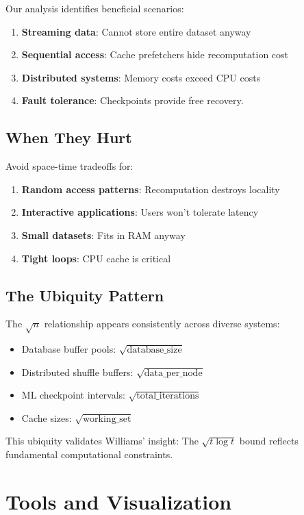 \documentclass[11pt]{article}
\theoremstyle{definition}
\begin{document}
Our analysis identifies beneficial scenarios:

\begin{enumerate}
\item \textbf{Streaming data}: Cannot store entire dataset anyway
\item \textbf{Sequential access}: Cache prefetchers hide recomputation cost
\item \textbf{Distributed systems}: Memory costs exceed CPU costs
\item \textbf{Fault tolerance}: Checkpoints provide free recovery.
\end{enumerate}

\subsection{When They Hurt}

Avoid space-time tradeoffs for:

\begin{enumerate}
\item \textbf{Random access patterns}: Recomputation destroys locality
\item \textbf{Interactive applications}: Users won't tolerate latency
\item \textbf{Small datasets}: Fits in RAM anyway
\item \textbf{Tight loops}: CPU cache is critical
\end{enumerate}

\subsection{The Ubiquity Pattern}

The $\sqrt{n}$ relationship appears consistently across diverse systems:
\begin{itemize}
\item Database buffer pools: $\sqrt{\text{database\_size}}$
\item Distributed shuffle buffers: $\sqrt{\text{data\_per\_node}}$
\item ML checkpoint intervals: $\sqrt{\text{total\_iterations}}$
\item Cache sizes: $\sqrt{\text{working\_set}}$
\end{itemize}

This ubiquity validates Williams' insight: The $\sqrt{t \log t}$ bound reflects fundamental computational constraints.

\section{Tools and Visualization}
\label{sec:tools}
\end{document}
